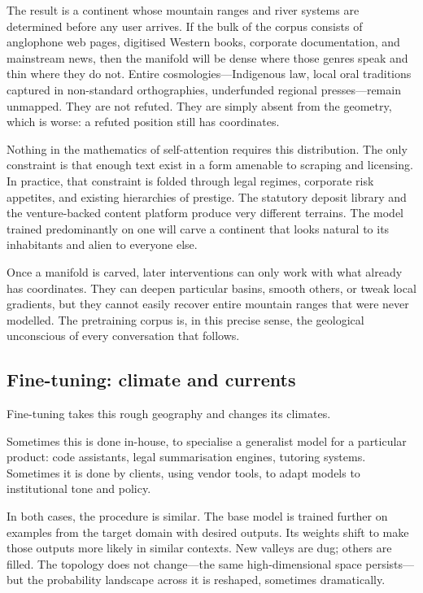 \documentclass[12pt,a4paper]{article}
\begin{document}
The result is a continent whose mountain ranges and river systems are determined before any user arrives. If the bulk of the corpus consists of anglophone web pages, digitised Western books, corporate documentation, and mainstream news, then the manifold will be dense where those genres speak and thin where they do not. Entire cosmologies---Indigenous law, local oral traditions captured in non-standard orthographies, underfunded regional presses---remain unmapped. They are not refuted. They are simply absent from the geometry, which is worse: a refuted position still has coordinates.

Nothing in the mathematics of self-attention requires this distribution. The only constraint is that enough text exist in a form amenable to scraping and licensing. In practice, that constraint is folded through legal regimes, corporate risk appetites, and existing hierarchies of prestige. The statutory deposit library and the venture-backed content platform produce very different terrains. The model trained predominantly on one will carve a continent that looks natural to its inhabitants and alien to everyone else.

Once a manifold is carved, later interventions can only work with what already has coordinates. They can deepen particular basins, smooth others, or tweak local gradients, but they cannot easily recover entire mountain ranges that were never modelled. The pretraining corpus is, in this precise sense, the geological unconscious of every conversation that follows.

\subsection*{Fine-tuning: climate and currents}

Fine-tuning takes this rough geography and changes its climates.

Sometimes this is done in-house, to specialise a generalist model for a particular product: code assistants, legal summarisation engines, tutoring systems. Sometimes it is done by clients, using vendor tools, to adapt models to institutional tone and policy.

In both cases, the procedure is similar. The base model is trained further on examples from the target domain with desired outputs. Its weights shift to make those outputs more likely in similar contexts. New valleys are dug; others are filled. The topology does not change---the same high-dimensional space persists---but the probability landscape across it is reshaped, sometimes dramatically.
\end{document}
